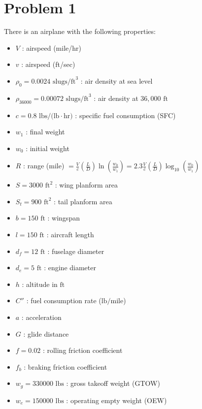 \documentclass{KPS_assignment}
\begin{document}
\maketitle
\section*{Problem 1}

There is an airplane with the following properties:

\begin{itemize}
    \item $V$ : airspeed (mile/hr)
    \item $v$ : airspeed (ft/sec)
    \item $\rho_0 = 0.0024 \text{ slugs/ft}^3$ : air density at sea level
    \item $\rho_{36000} = 0.00072 \text{ slugs/ft}^3$ : air density at $36,000 \text{ ft}$
    \item $c = 0.8 \text{ lbs/(lb}\cdot\text{hr)}$ : specific fuel consumption (SFC)
    \item $w_1$ : final weight
    \item $w_0$ : initial weight
    \item $R$ : range (mile) $= \frac{V}{c} \left(\frac{L}{D}\right) \ln\left(\frac{w_0}{w_1}\right) = 2.3 \frac{V}{c} \left(\frac{L}{D}\right) \log_{10}\left(\frac{w_0}{w_1}\right)$
    \item $S = 3000 \text{ ft}^2$ : wing planform area
    \item $S_t = 900 \text{ ft}^2$ : tail planform area
    \item $b = 150 \text{ ft}$ : wingspan
    \item $l = 150 \text{ ft}$ : aircraft length
    \item $d_f = 12 \text{ ft}$ : fuselage diameter
    \item $d_e = 5 \text{ ft}$ : engine diameter
    \item $h$ : altitude in $\text{ft}$
    \item $C''$ : fuel consumption rate ($\text{lb/mile}$)
    \item $a$ : acceleration
    \item $G$ : glide distance
    \item $f = 0.02$ : rolling friction coefficient
    \item $f_b$ : braking friction coefficient
    \item $w_g = 330000 \text{ lbs}$ : gross takeoff weight (GTOW)
    \item $w_e = 150000 \text{ lbs}$ : operating empty weight (OEW)

\end{itemize}
\end{document}
